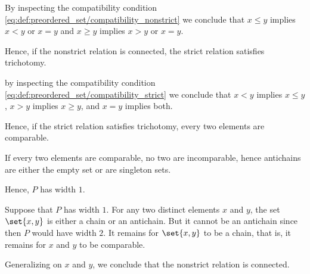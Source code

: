 \begin{defproof}
   By inspecting the compatibility condition \eqref{eq:def:preordered_set/compatibility_nonstrict} we conclude that \( x \leq y \) implies \( x < y \) or \( x = y \) and \( x \geq y \) implies \( x > y \) or \( x = y \).

  Hence, if the nonstrict relation is connected, the strict relation satisfies trichotomy.

   by inspecting the compatibility condition \eqref{eq:def:preordered_set/compatibility_strict} we conclude that \( x < y \) implies \( x \leq y \), \( x > y \) implies \( x \geq y \), and \( x = y \) implies both.

  Hence, if the strict relation satisfies trichotomy, every two elements are comparable.

   If every two elements are comparable, no two are incomparable, hence antichains are either the empty set or are singleton sets.

  Hence, \( P \) has width \( 1 \).

   Suppose that \( P \) has width \( 1 \). For any two distinct elements \( x \) and \( y \), the set \( \set{ x, y } \) is either a chain or an antichain. But it cannot be an antichain since then \( P \) would have width \( 2 \). It remains for \( \set{ x, y } \) to be a chain, that is, it remains for \( x \) and \( y \) to be comparable.

  Generalizing on \( x \) and \( y \), we conclude that the nonstrict relation is connected.
\end{defproof}

